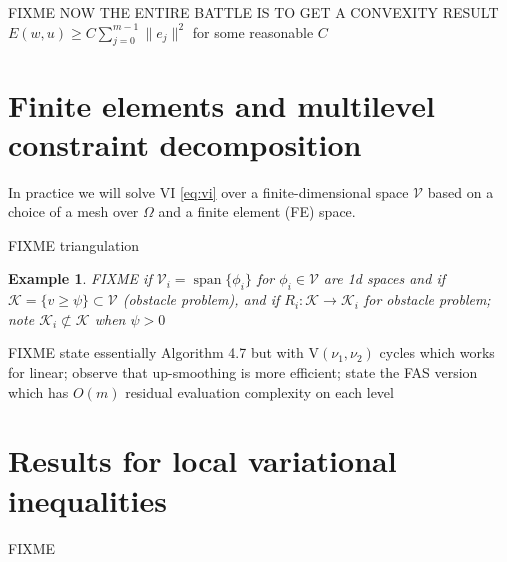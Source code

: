 \documentclass[letterpaper,final,12pt,reqno]{amsart}
\theoremstyle{cstyle}
\theoremstyle{cstyle*}
\theoremstyle{dstyle}
\newtheorem{example}[theorem]{Example}
\numberwithin{equation}{section}
\numberwithin{figure}{section}
\numberwithin{table}{section}
\numberwithin{theorem}{section}
\newcommand{\cK}{\mathcal{K}}
\newcommand{\cV}{\mathcal{V}}
\newcommand{\Span}{\operatorname{span}}
\begin{document}
FIXME NOW THE ENTIRE BATTLE IS TO GET A CONVEXITY RESULT $E(w,u) \ge C \sum_{j=0}^{m-1} \|e_j\|^2$ for some reasonable $C$

\section{Finite elements and multilevel constraint decomposition} \label{sec:multilevel}

In practice we will solve VI \eqref{eq:vi} over a finite-dimensional space $\cV$ based on a choice of a mesh over $\Omega$ and a finite element (FE) space.

FIXME triangulation

\begin{example}  FIXME if $\cV_i=\Span\{\phi_i\}$ for $\phi_i\in\cV$ are 1d spaces and if $\cK = \{v \ge \psi\} \subset \cV$ (obstacle problem), and if $R_i : \cK \to \cK_i$ for obstacle problem; note $\cK_i \not\subset \cK$ when $\psi>0$
\end{example}

FIXME state essentially Algorithm 4.7 \cite{GraeserKornhuber2009} but with $\text{V}(\nu_1,\nu_2)$ cycles which works for linear; observe that up-smoothing is more efficient; state the FAS version which has $O(m)$ residual evaluation complexity on each level


\section{Results for local variational inequalities} \label{sec:results}

FIXME






\end{document}
